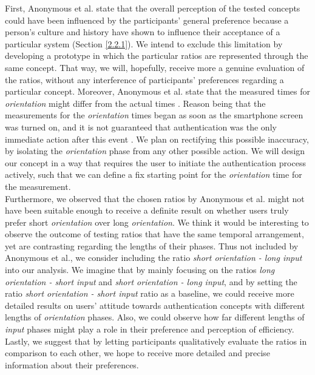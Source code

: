 First, Anonymous et al. \cite{anonymous} state that the overall perception of the tested concepts could have been influenced by the participants' general preference \cite{anonymous} because a person's culture and history have shown to influence their acceptance of a particular system \cite{Harbach:2016} (Section \ref{2.2.1}). We intend to exclude this limitation by developing a prototype in which the particular ratios are represented through the same concept. That way, we will, hopefully, receive more a genuine evaluation of the ratios, without any interference of participants' preferences regarding a particular concept. Moreover, Anonymous et al. \cite{anonymous} state that the measured times for \textit{orientation} might differ from the actual times \cite{anonymous}. Reason being that the measurements for the \textit{orientation} times began as soon as the smartphone screen was turned on, and it is not guaranteed that authentication was the only immediate action after this event \cite{anonymous}. We plan on rectifying this possible inaccuracy, by isolating the \textit{orientation} phase from any other possible action. We will design our concept in a way that requires the user to initiate the authentication process actively, such that we can define a fix starting point for the \textit{orientation} time for the measurement.\\

Furthermore, we observed that the chosen ratios by Anonymous et al. \cite{anonymous} might not have been suitable enough to receive a definite result on whether users truly prefer short \textit{orientation} over long \textit{orientation}. We think it would be interesting to observe the outcome of testing ratios that have the same temporal arrangement, yet are contrasting regarding the lengths of their phases. Thus not included by Anonymous et al., we consider including the ratio \textit{short orientation - long input} into our analysis. We imagine that by mainly focusing on the ratios \textit{long orientation - short input} and \textit{short orientation - long input}, and by setting the ratio \textit{short orientation - short input} ratio as a baseline, we could receive more detailed results on users' attitude towards authentication concepts with different lengths of \textit{orientation} phases. Also, we could observe how far different lengths of \textit{input} phases might play a role in their preference and perception of efficiency. Lastly, we suggest that by letting participants qualitatively evaluate the ratios in comparison to each other, we hope to receive more detailed and precise information about their preferences.  







